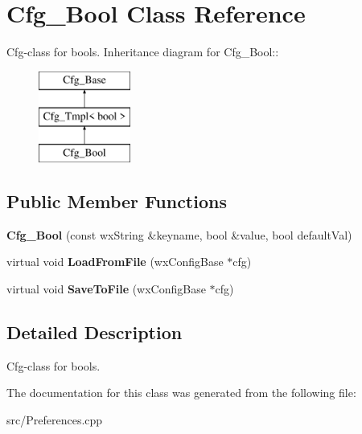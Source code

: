 \section{Cfg\_\-Bool Class Reference}
\label{classCfg__Bool}


Cfg-\/class for bools.  
Inheritance diagram for Cfg\_\-Bool::\begin{figure}[H]
\begin{center}
\leavevmode
\includegraphics[height=3cm]{classCfg__Bool}
\end{center}
\end{figure}
\subsection*{Public Member Functions}
\begin{DoxyCompactItemize}
\item 
{\bfseries Cfg\_\-Bool} (const wxString \&keyname, bool \&value, bool defaultVal)\label{classCfg__Bool_a285a535f9271a7acdad7cd0b9ff43c7d}

\item 
virtual void {\bf LoadFromFile} (wxConfigBase $\ast$cfg)\label{classCfg__Bool_ae3b71a94cc691dcdb0d979aa9a39380f}

\item 
virtual void {\bf SaveToFile} (wxConfigBase $\ast$cfg)\label{classCfg__Bool_a419f8e5a315bd513c806ddb52260f2ec}

\end{DoxyCompactItemize}


\subsection{Detailed Description}
Cfg-\/class for bools. 

The documentation for this class was generated from the following file:\begin{DoxyCompactItemize}
\item 
src/Preferences.cpp\end{DoxyCompactItemize}
